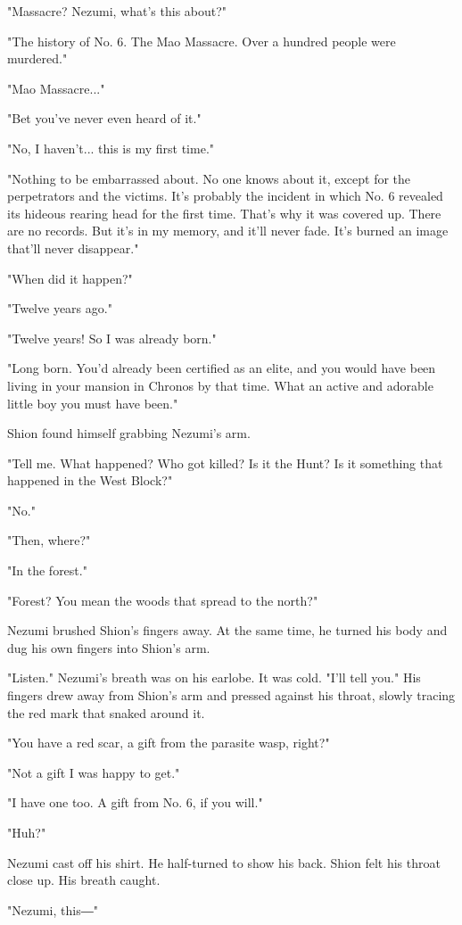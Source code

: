 "Massacre? Nezumi, what's this about?"

"The history of No. 6. The Mao Massacre. Over a hundred people were
murdered."

"Mao Massacre..."

"Bet you've never even heard of it."

"No, I haven't... this is my first time."

"Nothing to be embarrassed about. No one knows about it, except for the
perpetrators and the victims. It's probably the incident in which No. 6
revealed its hideous rearing head for the first time. That's why it was
covered up. There are no records. But it's in my memory, and it'll never
fade. It's burned an image that'll never disappear."

"When did it happen?"

"Twelve years ago."

"Twelve years! So I was already born."

"Long born. You'd already been certified as an elite, and you would have
been living in your mansion in Chronos by that time. What an active and
adorable little boy you must have been."

Shion found himself grabbing Nezumi's arm.

"Tell me. What happened? Who got killed? Is it the Hunt? Is it something
that happened in the West Block?"

"No."

"Then, where?"

"In the forest."

"Forest? You mean the woods that spread to the north?"

Nezumi brushed Shion's fingers away. At the same time, he turned his
body and dug his own fingers into Shion's arm.

"Listen." Nezumi's breath was on his earlobe. It was cold. "I'll tell
you." His fingers drew away from Shion's arm and pressed against his
throat, slowly tracing the red mark that snaked around it.

"You have a red scar, a gift from the parasite wasp, right?"

"Not a gift I was happy to get."

"I have one too. A gift from No. 6, if you will."

"Huh?"

Nezumi cast off his shirt. He half-turned to show his back. Shion felt
his throat close up. His breath caught.

"Nezumi, this―"

